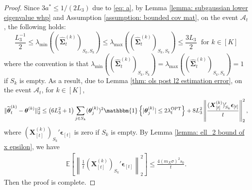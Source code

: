 \documentclass[aos,preprint]{imsart}
\theoremstyle{plain}
\theoremstyle{definition}
\newcommand{\btheta}{\boldsymbol{\theta}}
\newcommand{\bd}[1]{\boldsymbol{#1}}
\newcommand{\idf}{\mathbbm{1}}
\newcommand{\bX}{\boldsymbol{X}}
\newcommand{\lmin}[1]{\lambda_{\min}\left(#1\right)}
\newcommand{\lmax}[1]{\lambda_{\max}\left(#1\right)}
\newcommand{\tbtheta}{\widetilde{\boldsymbol{\theta}}}
\newcommand{\hdlambda}{\lambda^{\textup{OPT}}}
\newcommand{\hbSigma}{\hat{\boldsymbol{\Sigma}}}
\newcommand{\bepsilon}{\bd{\epsilon}}
\newcommand{\Exp}{\mathbb{E}}
\begin{document}
\begin{appendix}
\begin{proof}
Since $3a^* \leq 1/(2L_3)$ due to \eqref{eq: a}, by Lemma \ref{lemma: subgaussian lower eigenvalue whp} and Assumption \ref{assumption: bounded cov mat}, on the event $\mathcal{A}_{t}$, the following holds:
\begin{equation*}
 \frac{L_3^{-1}}{2} \le \lmin{(\hbSigma_{t}^{(k)})_{S_k, S_k}} \le \lmax{(\hbSigma_{t}^{(k)})_{S_k, S_k}} \le \frac{3L_3}{2} \; \text{ for } k \in [K]
\end{equation*}
 where the convention is that $\lmin{(\hbSigma_{t}^{(k)})_{S_k, S_k}} = \lmax{(\hbSigma_{t}^{(k)})_{S_k, S_k}} = 1$ if $S_k$ is empty. As a result, due to Lemma \ref{thm: ols post l2 estimation error}, on the event $\mathcal{A}_{t}$, for $k \in [K]$,
\begin{align*}
    \|\tbtheta_{t}^{(k)}-\btheta^{(k)}\|_2^2 \leq \left(6L_3^2  + 1\right) \sum_{j\in S_k} (\btheta^{(k)}_j)^2 \idf\left\{|\btheta^{(k)}_j| \le 2\hdlambda_t \right\} + 8L_3^2 \left\|\frac{(\bX_{[t]}^{(k)})_{S_k}'\bepsilon_{[t]}}{t}\right\|_2^2,
 \end{align*}
 where $(\bX_{[t]}^{(k)})_{S_k}'\bepsilon_{[t]}$ is zero if $S_k$ is empty. By Lemma \ref{lemma: ell_2 bound of x epsilon}, we have
 \begin{align*}
\Exp\left[\left\|\frac{1}{t}(\bX_{[t]}^{(k)})_{S_k}'\bepsilon_{[t]}\right\|_2^2\right] \leq \frac{4(m_X\sigma)^2 s_0}{t}.
 \end{align*}
 Then the proof is complete.
\end{proof}




\end{appendix}
\end{document}
